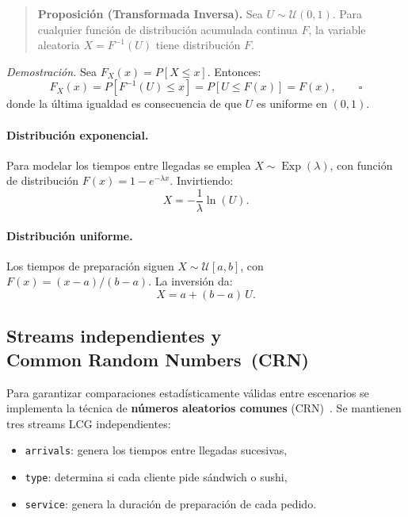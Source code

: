 \begin{quote}
\textbf{Proposición (Transformada Inversa).}
Sea $U \sim \mathcal{U}(0,1)$.
Para cualquier función de distribución acumulada continua $F$, la variable
aleatoria $X = F^{-1}(U)$ tiene distribución $F$.
\end{quote}

\textit{Demostración.}
Sea $F_X(x) = P[X \le x]$.
Entonces:
\[
  F_X(x) = P\!\left[F^{-1}(U) \le x\right]
          = P\!\left[U \le F(x)\right]
          = F(x), \qquad \square
\]
donde la última igualdad es consecuencia de que $U$ es uniforme en $(0,1)$.

\paragraph{Distribución exponencial.}
Para modelar los tiempos entre llegadas se emplea
$X \sim \operatorname{Exp}(\lambda)$, con función de distribución
$F(x) = 1 - e^{-\lambda x}$.
Invirtiendo:
\begin{equation}
  X = -\frac{1}{\lambda}\ln(U).
  \label{eq:exp}
\end{equation}

\paragraph{Distribución uniforme.}
Los tiempos de preparación siguen
$X \sim \mathcal{U}[a,b]$, con $F(x) = (x-a)/(b-a)$.
La inversión da:
\begin{equation}
  X = a + (b - a)\,U.
  \label{eq:unif}
\end{equation}

\subsection[Streams independientes y Common Random Numbers (CRN)]{Streams independientes y\\ Common Random Numbers~(CRN)}

Para garantizar comparaciones estadísticamente válidas entre escenarios se
implementa la técnica de \textbf{números aleatorios comunes}
(CRN)~\citep{law2015simulation}.
Se mantienen tres streams LCG independientes:
\begin{itemize}
  \item \texttt{arrivals}: genera los tiempos entre llegadas sucesivas,
  \item \texttt{type}: determina si cada cliente pide sándwich o sushi,
  \item \texttt{service}: genera la duración de preparación de cada pedido.
\end{itemize}

